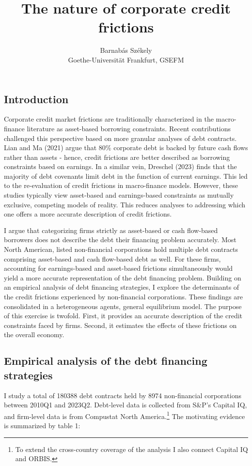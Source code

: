 \documentclass[12pt]{article}
\title{The nature of corporate credit frictions}
\author{Barnabás Székely \\ \small  Goethe-Universität Frankfurt, GSEFM}
\date{}
\begin{document}
\maketitle

\subsection*{Introduction} \label{sec:introduction}

Corporate credit market frictions are traditionally characterized in the macro-finance literature as asset-based borrowing constraints. Recent contributions challenged this perspective based on more granular analyses of debt contracts. Lian and Ma (2021) argue that 80\% corporate debt is backed by future cash flows rather than assets - hence, credit frictions are better described as borrowing constraints based on earnings. In a similar vein, Dreschel (2023) finds that the majority of debt covenants limit debt in the function of current earnings. This led to the re-evaluation of credit frictions in macro-finance models. However, these studies typically view asset-based and earnings-based constraints as mutually exclusive, competing models of reality. This reduces analyses to addressing which one offers a more accurate description of credit frictions.  

I argue that categorizing firms strictly as asset-based or cash flow-based borrowers does not describe the debt their financing problem accurately. Most North American, listed non-financial corporations hold multiple debt contracts comprising asset-based and cash flow-based debt as well. For these firms, accounting for earnings-based and asset-based frictions simultaneously would yield a more accurate representation of the debt financing problem. Building on an empirical analysis of debt financing strategies, I explore the determinants of the credit frictions experienced by non-financial corporations. These findings are consolidated in a heterogeneous agents, general equilibrium model. The purpose of this exercise is twofold. First, it provides an accurate description of the credit constraints faced by firms. Second, it estimates the effects of these frictions on the overall economy. 

\subsection*{Empirical analysis of the debt financing strategies}
I study a total of 180388 debt contracts held by 8974 non-financial corporations between 2010Q1 and 2023Q2. Debt-level data is collected from S\&P's Capital IQ, and firm-level data is from Compustat North America.\footnote{To extend the cross-country coverage of the analysis I also connect Capital IQ and ORBIS.} The motivating evidence is summarized by table 1: 
\end{document}
